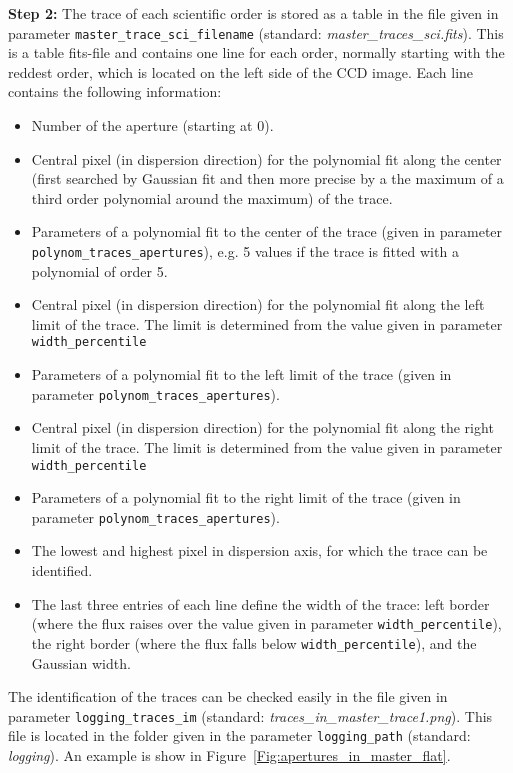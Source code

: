 \documentclass[10pt,a4paper]{article}
\begin{document}
\vspace{0.5em}\noindent \textbf{Step 2:} The trace of each scientific order is stored as a table in the file given in parameter \verb|master_trace_sci_filename| (standard: \textit{master\_traces\_sci.fits}). This is a table fits-file and contains one line for each order, normally starting with the reddest order, which is located on the left side of the CCD image. Each line contains the following information:
\begin{itemize}\setlength\itemsep{0em}
  \item Number of the aperture (starting at 0).
  \item Central pixel (in dispersion direction) for the polynomial fit along the center (first searched by Gaussian fit and then more precise by a the maximum of a third order polynomial around the maximum) of the trace.
  \item Parameters of a polynomial fit to the center of the trace (given in parameter \verb|polynom_traces_apertures|), e.g. 5 values if the trace is fitted with a polynomial of order 5.
  \item Central pixel (in dispersion direction) for the polynomial fit along the left limit of the trace. The limit is determined from the value given in parameter \verb|width_percentile|
  \item Parameters of a polynomial fit to the left limit of the trace (given in parameter \verb|polynom_traces_apertures|).
  \item Central pixel (in dispersion direction) for the polynomial fit along the right limit of the trace. The limit is determined from the value given in parameter \verb|width_percentile|
  \item Parameters of a polynomial fit to the right limit of the trace (given in parameter \verb|polynom_traces_apertures|).
  \item The lowest and highest pixel in dispersion axis, for which the trace can be identified.
  \item The last three entries of each line define the width of the trace: left border (where the flux raises over the value given in parameter \verb|width_percentile|), the right border (where the flux falls below \verb|width_percentile|), and the Gaussian width.
\end{itemize}
The identification of the traces can be checked easily in the file given in parameter \verb|logging_traces_im| (standard: \textit{traces\_in\_master\_trace1.png}). This file is located in the folder given in the parameter \verb|logging_path| (standard: \textit{logging}). An example is show in Figure~\ref{Fig:apertures_in_master_flat}.
\end{document}
